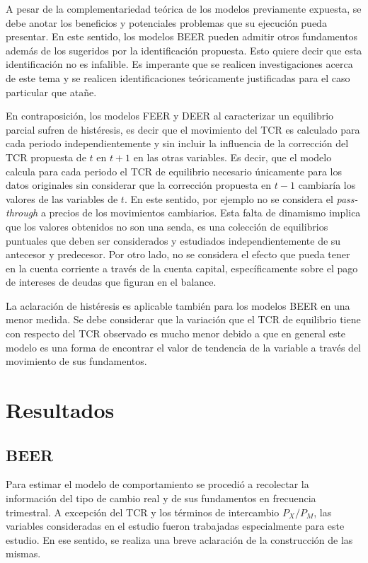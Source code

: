 \documentclass[12pt,letterpaper]{article}
\begin{document}
A pesar de la complementariedad teórica de los modelos previamente expuesta, se debe anotar los beneficios y potenciales problemas que su ejecución pueda presentar. En este sentido, los modelos BEER pueden admitir otros fundamentos además de los sugeridos por la identificación propuesta. Esto quiere decir que esta identificación no es infalible. Es imperante que se realicen investigaciones acerca de este tema y se realicen identificaciones teóricamente justificadas para el caso particular que atañe. 

En contraposición, los modelos FEER  y DEER al caracterizar un equilibrio parcial sufren de histéresis, es decir que el movimiento del TCR es calculado para cada periodo independientemente y sin incluir la influencia de la corrección del TCR propuesta de $t$ en $t+1$ en las otras variables. Es decir, que el modelo calcula para cada periodo el TCR de equilibrio necesario únicamente para los datos originales sin considerar que la corrección propuesta en $t-1$ cambiaría los valores de las variables de $t$. En este sentido, por ejemplo no se considera el \emph{pass-through} a precios de los movimientos cambiarios. Esta falta de dinamismo implica que los valores obtenidos no son una senda, es una colección de equilibrios puntuales que deben ser considerados y estudiados independientemente de su antecesor y predecesor. Por otro lado, no se considera el efecto que pueda tener en la cuenta corriente a través de la cuenta capital, específicamente sobre el pago de intereses de deudas que figuran en el balance.

La aclaración de histéresis es aplicable también para los modelos BEER en una menor medida. Se debe considerar que la variación que el TCR de equilibrio tiene con respecto del TCR observado es mucho menor debido a que en general este modelo es una forma de encontrar el valor de tendencia de la variable a través del movimiento de sus fundamentos.

\section{Resultados}\label{calc}

\subsection*{BEER}
Para estimar el modelo de comportamiento se procedió a recolectar la información del tipo de cambio real y de sus fundamentos en frecuencia trimestral. A excepción del TCR y los términos de intercambio $P_X/P_M$, las variables consideradas en el estudio fueron trabajadas especialmente para este estudio. En ese sentido, se realiza una breve aclaración de la construcción de las mismas. 
\end{document}
